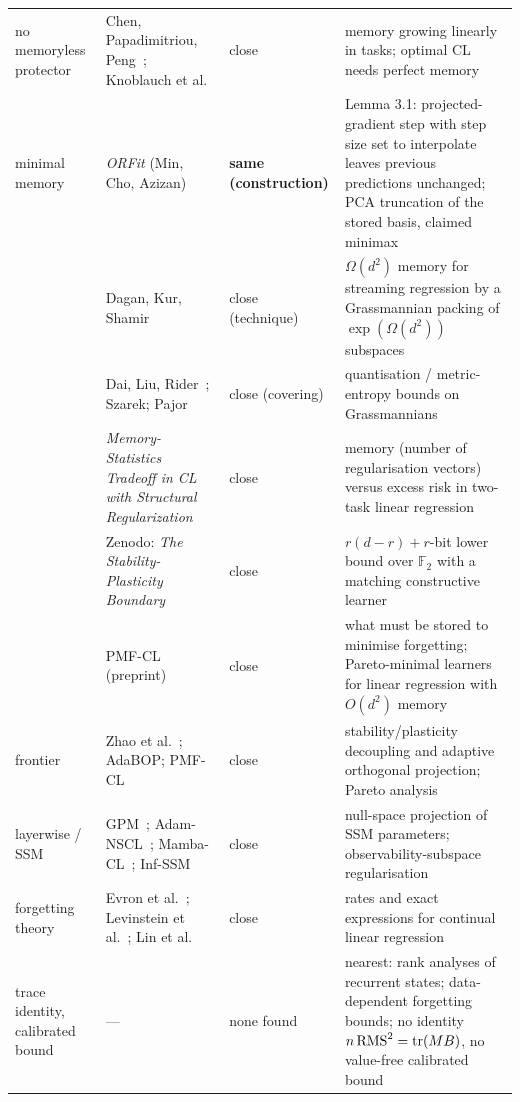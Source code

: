 \begin{table}[!htbp]
\begin{tabular}{>{\raggedright\arraybackslash}p{1.25cm}>{\raggedright\arraybackslash}p{4.6cm}>{\raggedright\arraybackslash}p{1.8cm}>{\raggedright\arraybackslash}p{6.4cm}}
    no memoryless protector & Chen, Papadimitriou, Peng~\citep{chen2022memory}; Knoblauch et al.~\citep{knoblauch2020optimal} & close & memory growing linearly in tasks; optimal CL needs perfect memory \\
    minimal memory & \textit{ORFit} (Min, Cho, Azizan)~\citep{min2022orfit} & \textbf{same (construction)} & Lemma 3.1: projected-gradient step with step size set to interpolate leaves previous predictions unchanged; PCA truncation of the stored basis, claimed minimax \\
    & Dagan, Kur, Shamir~\citep{dagan2019space} & close (technique) & $\Omega(d^2)$ memory for streaming regression by a Grassmannian packing of $\exp(\Omega(d^2))$ subspaces \\
    & Dai, Liu, Rider~\citep{dai2007quantization}; Szarek; Pajor & close (covering) & quantisation / metric-entropy bounds on Grassmannians \\
    & \textit{Memory-Statistics Tradeoff in CL with Structural Regularization}~\citep{li2025memorystatistics} & close & memory (number of regularisation vectors) versus excess risk in two-task linear regression \\
    & Zenodo: \textit{The Stability-Plasticity Boundary} & close & $r(d-r)+r$-bit lower bound over $\mathbb F_2$ with a matching constructive learner \\
    & PMF-CL~\citep{nair2026pmfcl} (preprint) & close & what must be stored to minimise forgetting; Pareto-minimal learners for linear regression with $O(d^2)$ memory \\
    frontier & Zhao et al.~\citep{zhao2023rethinking}; AdaBOP; PMF-CL & close & stability/plasticity decoupling and adaptive orthogonal projection; Pareto analysis \\
    layerwise / SSM & GPM~\citep{saha2021gradient}; Adam-NSCL~\citep{wang2021training}; Mamba-CL~\citep{cheng2024mamba}; Inf-SSM~\citep{lee2025exemplar} & close & null-space projection of SSM parameters; observability-subspace regularisation \\
    forgetting theory & Evron et al.~\citep{evron2022catastrophic}; Levinstein et al.~\citep{levinstein2025optimal}; Lin et al.~\citep{lin2023theory} & close & rates and exact expressions for continual linear regression \\
    trace identity, calibrated bound & --- & none found & nearest: rank analyses of recurrent states; data-dependent forgetting bounds; no identity $n\,\mathrm{RMS}^2=\operatorname{tr}(MB)$, no value-free calibrated bound \\
    \bottomrule
  \end{tabular}
\end{table}

